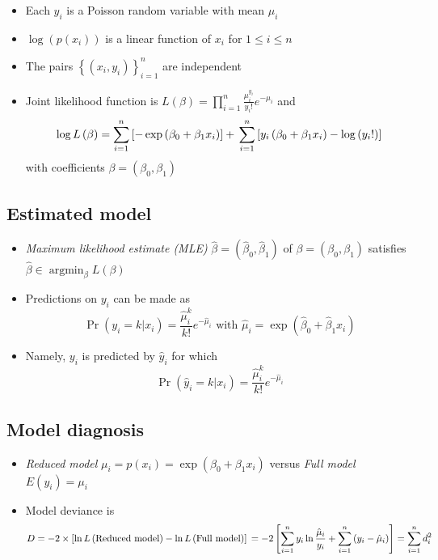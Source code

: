 \documentclass[]{article}
\begin{document}
\begin{itemize}
\item
  Each \(y_{i}\) is a Poisson random variable with mean \(\mu_{i}\)
\item
  \(\log\left( p\left( x_{i}\right) \right)\) is a linear function of
  \(x_{i}\) for \(1\leq i\leq n\)
\item
  The pairs \(\left\{ \left( x_{i},y_{i}\right) \right\}_{i=1}^{n}\) are
  independent
\item
  Joint likelihood function is
  \(L\left(\beta\right) =\prod\nolimits_{i=1}^{n}\frac{\mu_{i}^{y_{i}}}{y_{i}!}e^{-\mu_{i}}\)
  and \[
  \log L\left(  \beta\right)  =\sum_{i=1}^{n}\left[  -\exp\left(  \beta
  _{0}+\beta_{1}x_{i}\right)  \right]  + \\
  \sum_{i=1}^{n}\left[  y_{i}\left(
  \beta_{0}+\beta_{1}x_{i}\right)  -\log\left(  y_{i}!\right)  \right]
  \] with coefficients \(\beta=\left( \beta_{0},\beta_{1}\right)\)
\end{itemize}

\subsection{Estimated model}\label{estimated-model}

\begin{itemize}
\item
  \emph{Maximum likelihood estimate (MLE)}
  \(\hat{\beta}=\left( \hat{\beta}_{0} ,\hat{\beta}_{1}\right)\) of
  \(\beta=\left(\beta_{0},\beta_{1}\right)\) satisfies
  \(\hat{\beta}\in\operatorname*{argmin}_{\beta}L\left( \beta\right)\)
\item
  Predictions on \(y_{i}\) can be made as \[
  \Pr\left(  y_{i}=k|x_{i}\right)  =\frac{\hat{\mu}_{i}^{k}}{k!}e^{-\hat{\mu
  }_{i}}\text{  with }\hat{\mu}_{i}=\exp\left(  \hat{\beta}_{0}+\hat{\beta}
  _{1}x_{i}\right)
  \]
\item
  Namely, \(y_{i}\) is predicted by \(\hat{y}_{i}\) for which \[
  \Pr\left(  \hat{y}_{i}=k|x_{i}\right)  =\frac{\hat{\mu}_{i}^{k}}{k!}e^{-\hat{\mu}_{i}}
  \]
\end{itemize}

\subsection{Model diagnosis}\label{model-diagnosis}

\begin{itemize}
\item
  \emph{Reduced model}
  \(\mu_{i}=p\left( x_{i}\right) =\exp\left( \beta_{0}+\beta_{1}x_{i}\right)\)
  versus \emph{Full model} \(E\left( y_{i}\right) =\mu_{i}\)
\item
  Model deviance is \[
  D   =-2\times\left[  \ln L\left(  \text{Reduced model}\right)  -\ln L\left(
  \text{Full model}\right)  \right] \\
   =-2\left[  \sum_{i=1}^{n}y_{i}\ln\frac{\hat{\mu}_{i}}{y_{i}}+\sum_{i=1}
  ^{n}\left(  y_{i}-\hat{\mu}_{i}\right)  \right]  =\sum_{i=1}^{n}d_{i}^{2}
  \]
\end{itemize}
\end{document}
